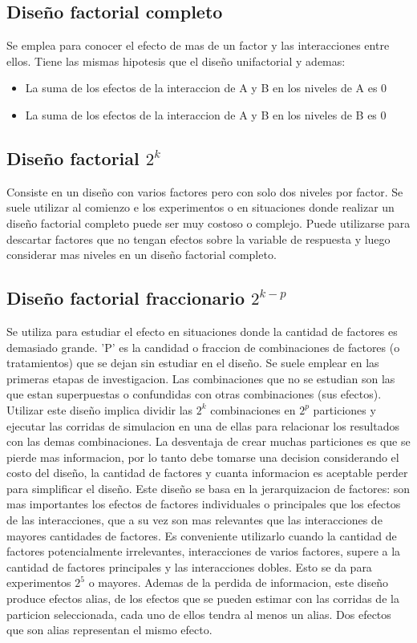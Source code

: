\documentclass[a4paper]{article}
\begin{document}
\subsection*{Diseño factorial completo}
Se emplea para conocer el efecto de mas de un factor y las interacciones entre ellos.
Tiene las mismas hipotesis que el diseño unifactorial y ademas:
\begin{itemize}
    \item La suma de los efectos de la interaccion de A y B en los niveles de A es 0
    \item La suma de los efectos de la interaccion de A y B en los niveles de B es 0
\end{itemize}

\subsection*{Diseño factorial $2^k$}
Consiste en un diseño con varios factores pero con solo dos niveles por factor. 
Se suele utilizar al comienzo e los experimentos o en situaciones donde realizar un 
diseño factorial completo puede ser muy costoso o complejo. Puede utilizarse para descartar 
factores que no tengan efectos sobre la variable de respuesta y luego considerar mas niveles 
en un diseño factorial completo.

\subsection*{Diseño factorial fraccionario $2^{k-p}$}
Se utiliza para estudiar el efecto en situaciones donde la cantidad de factores es demasiado
grande. 'P' es la candidad o fraccion de combinaciones de factores (o tratamientos) que se dejan sin estudiar 
en el diseño.
Se suele emplear en las primeras etapas de investigacion.
Las combinaciones que no se estudian son las que estan superpuestas o confundidas con otras 
combinaciones (sus efectos).
Utilizar este diseño implica dividir las $2^k$ combinaciones en $2^p$ particiones y ejecutar 
las corridas de simulacion en una de ellas para relacionar los resultados con las demas combinaciones.
La desventaja de crear muchas particiones es que se pierde mas informacion, por lo tanto debe 
tomarse una decision considerando el costo del diseño, la cantidad de factores y cuanta informacion 
es aceptable perder para simplificar el diseño.
Este diseño se basa en la jerarquizacion de factores: son mas importantes los efectos de factores 
individuales o principales que los efectos de las interacciones, que a su vez son mas relevantes que
las interacciones de mayores cantidades de factores.
Es conveniente utilizarlo cuando la cantidad de factores potencialmente irrelevantes, interacciones de 
varios factores, supere a la cantidad de factores principales y las interacciones dobles. Esto se da
para experimentos $2^5$ o mayores.
Ademas de la perdida de informacion, este diseño produce efectos alias, de los efectos que se pueden 
estimar con las corridas de la particion seleccionada, cada uno de ellos tendra al menos un alias. 
Dos efectos que son alias representan el mismo efecto.
\end{document}
